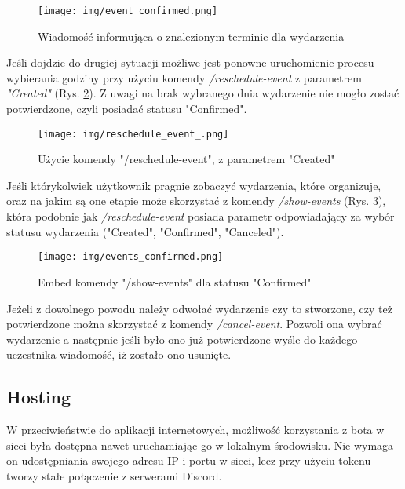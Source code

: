 \documentclass[11pt,a4paper]{article}
\begin{document}
\begin{figure}[H]
    \centering
    \texttt{[image: img/event\_confirmed.png]}
    \caption{Wiadomość informująca o znalezionym terminie dla wydarzenia}
    \label{fig: event confirmed}
\end{figure}

Jeśli dojdzie do drugiej sytuacji możliwe jest ponowne uruchomienie procesu wybierania godziny przy użyciu komendy \textit{/reschedule-event} z parametrem \textit{"Created"} (Rys. \ref{fig: reschedule event}). Z uwagi na brak wybranego dnia wydarzenie nie mogło zostać potwierdzone, czyli posiadać statusu "Confirmed".

\begin{figure}[H]
    \centering
    \texttt{[image: img/reschedule\_event\_.png]}
    \caption{Użycie komendy "/reschedule-event", z parametrem "Created"}
    \label{fig: reschedule event}
\end{figure}

Jeśli którykolwiek użytkownik pragnie zobaczyć wydarzenia, które organizuje, oraz na jakim są one etapie może skorzystać z komendy \textit{/show-events} (Rys. \ref{fig: show events confirmed}), która podobnie jak \textit{/reschedule-event} posiada parametr odpowiadający za wybór statusu wydarzenia ("Created", "Confirmed", "Canceled").

\begin{figure}[H]
    \centering
    \texttt{[image: img/events\_confirmed.png]}
    \caption{Embed komendy "/show-events" dla statusu "Confirmed"}
    \label{fig: show events confirmed}
\end{figure}

Jeżeli z dowolnego powodu należy odwołać wydarzenie czy to stworzone, czy też potwierdzone można skorzystać z komendy \textit{/cancel-event}. Pozwoli ona wybrać wydarzenie a następnie jeśli było ono już potwierdzone wyśle do każdego uczestnika wiadomość, iż zostało ono usunięte.

\subsection{Hosting}

W przeciwieństwie do aplikacji internetowych, możliwość korzystania z bota w sieci była dostępna nawet uruchamiając go w lokalnym środowisku. Nie wymaga on udostępniania swojego adresu IP i portu w sieci, lecz przy użyciu tokenu tworzy stałe połączenie z serwerami Discord. 
\end{document}
